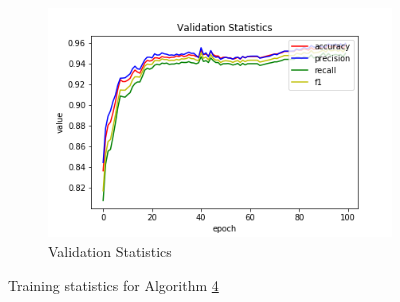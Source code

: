\begin{figure}[h!]
\begin{subfigure}[b]{0.35\linewidth}
    \includegraphics[width=\linewidth]{images/trained_online_lstm/tile_by_tile_training_uniform_random_fill_10000_block_map_10000_model_validation_stats.png}
     \caption{Validation Statistics}
  \end{subfigure}
  \caption{Training statistics for Algorithm \hyperref[tab: app_evalalgorithms]{4}}
  \label{fig: train_olnine_lstm_4}
\end{figure}

\pagebreak

